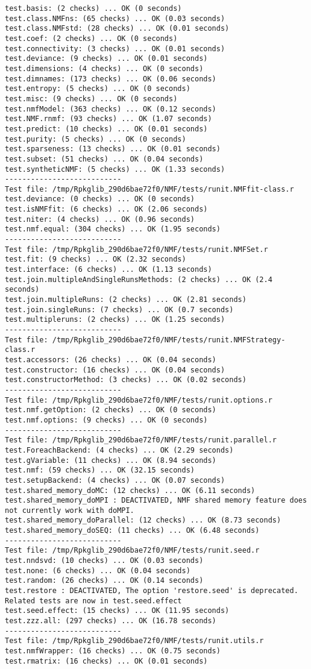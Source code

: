 \documentclass[10pt]{article}
\begin{document}
\begin{verbatim}
test.basis: (2 checks) ... OK (0 seconds)
test.class.NMFns: (65 checks) ... OK (0.03 seconds)
test.class.NMFstd: (28 checks) ... OK (0.01 seconds)
test.coef: (2 checks) ... OK (0 seconds)
test.connectivity: (3 checks) ... OK (0.01 seconds)
test.deviance: (9 checks) ... OK (0.01 seconds)
test.dimensions: (4 checks) ... OK (0 seconds)
test.dimnames: (173 checks) ... OK (0.06 seconds)
test.entropy: (5 checks) ... OK (0 seconds)
test.misc: (9 checks) ... OK (0 seconds)
test.nmfModel: (363 checks) ... OK (0.12 seconds)
test.NMF.rnmf: (93 checks) ... OK (1.07 seconds)
test.predict: (10 checks) ... OK (0.01 seconds)
test.purity: (5 checks) ... OK (0 seconds)
test.sparseness: (13 checks) ... OK (0.01 seconds)
test.subset: (51 checks) ... OK (0.04 seconds)
test.syntheticNMF: (5 checks) ... OK (1.33 seconds)
--------------------------- 
Test file: /tmp/Rpkglib_290d6bae72f0/NMF/tests/runit.NMFfit-class.r 
test.deviance: (0 checks) ... OK (0 seconds)
test.isNMFfit: (6 checks) ... OK (2.06 seconds)
test.niter: (4 checks) ... OK (0.96 seconds)
test.nmf.equal: (304 checks) ... OK (1.95 seconds)
--------------------------- 
Test file: /tmp/Rpkglib_290d6bae72f0/NMF/tests/runit.NMFSet.r 
test.fit: (9 checks) ... OK (2.32 seconds)
test.interface: (6 checks) ... OK (1.13 seconds)
test.join.multipleAndSingleRunsMethods: (2 checks) ... OK (2.4 seconds)
test.join.multipleRuns: (2 checks) ... OK (2.81 seconds)
test.join.singleRuns: (7 checks) ... OK (0.7 seconds)
test.multipleruns: (2 checks) ... OK (1.25 seconds)
--------------------------- 
Test file: /tmp/Rpkglib_290d6bae72f0/NMF/tests/runit.NMFStrategy-class.r 
test.accessors: (26 checks) ... OK (0.04 seconds)
test.constructor: (16 checks) ... OK (0.04 seconds)
test.constructorMethod: (3 checks) ... OK (0.02 seconds)
--------------------------- 
Test file: /tmp/Rpkglib_290d6bae72f0/NMF/tests/runit.options.r 
test.nmf.getOption: (2 checks) ... OK (0 seconds)
test.nmf.options: (9 checks) ... OK (0 seconds)
--------------------------- 
Test file: /tmp/Rpkglib_290d6bae72f0/NMF/tests/runit.parallel.r 
test.ForeachBackend: (4 checks) ... OK (2.29 seconds)
test.gVariable: (11 checks) ... OK (8.94 seconds)
test.nmf: (59 checks) ... OK (32.15 seconds)
test.setupBackend: (4 checks) ... OK (0.07 seconds)
test.shared_memory_doMC: (12 checks) ... OK (6.11 seconds)
test.shared_memory_doMPI : DEACTIVATED, NMF shared memory feature does not currently work with doMPI.
test.shared_memory_doParallel: (12 checks) ... OK (8.73 seconds)
test.shared_memory_doSEQ: (11 checks) ... OK (6.48 seconds)
--------------------------- 
Test file: /tmp/Rpkglib_290d6bae72f0/NMF/tests/runit.seed.r 
test.nndsvd: (10 checks) ... OK (0.03 seconds)
test.none: (6 checks) ... OK (0.04 seconds)
test.random: (26 checks) ... OK (0.14 seconds)
test.restore : DEACTIVATED, The option 'restore.seed' is deprecated. Related tests are now in test.seed.effect
test.seed.effect: (15 checks) ... OK (11.95 seconds)
test.zzz.all: (297 checks) ... OK (16.78 seconds)
--------------------------- 
Test file: /tmp/Rpkglib_290d6bae72f0/NMF/tests/runit.utils.r 
test.nmfWrapper: (16 checks) ... OK (0.75 seconds)
test.rmatrix: (16 checks) ... OK (0.01 seconds)


\end{verbatim}
\end{document}
